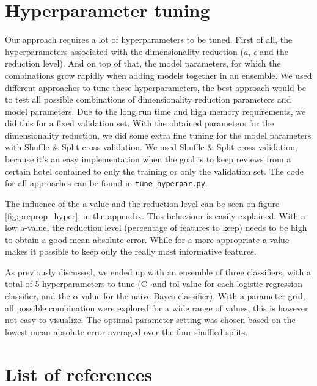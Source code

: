 \documentclass[a4paper,12pt]{article}
\begin{document}
\section{Hyperparameter tuning}
Our approach requires a lot of hyperparameters to be tuned. First of all, the hyperparameters associated with the dimensionality reduction ($a$, $\epsilon$ and the reduction level). And on top of that, the model parameters, for which the combinations grow rapidly when adding models together in an ensemble. We used different approaches to tune these hyperparameters, the best approach would be to test all possible combinations of dimensionality reduction parameters and model parameters. Due to the long run time and high memory requirements, we did this for a fixed validation set. With the obtained parameters for the dimensionality reduction, we did some extra fine tuning for the model parameters with  Shuffle \& Split cross validation. We used Shuffle \& Split cross validation, because it's an easy implementation when the goal is to keep reviews from a certain hotel contained to only the training or only the validation set. The code for all approaches can be found in \texttt{tune\_hyperpar.py}.

The influence of the a-value and the reduction level can be seen on figure \ref{fig:preprop_hyper}, in the appendix. This behaviour is easily explained. With a low a-value, the reduction level (percentage of features to keep) needs to be high to obtain a good mean absolute error. While for a more appropriate a-value makes it possible to keep only the really most informative features.

As previously discussed, we ended up with an ensemble of three classifiers, with a total of 5 hyperparameters to tune (C- and tol-value for each logistic regression classifier, and the $\alpha$-value for the naive Bayes classifier). With a parameter grid, all possible combination were explored for a wide range of values, this is however not easy to visualize. The optimal parameter setting was chosen based on the lowest mean absolute error averaged over the four shuffled splits.

\section{List of references}
\end{document}
